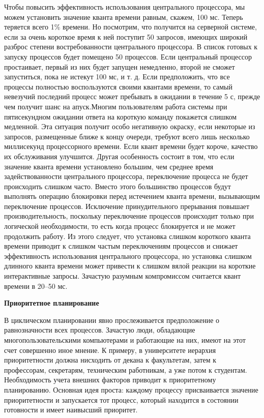 Чтобы повысить эффективность использования центрального процессора, мы можем установить значение кванта времени равным, скажем, 100 мс. Теперь теряется всего 1\% времени. Но посмотрим, что получится на серверной системе, если за очень короткое время к ней поступит 50 запросов, имеющих широкий разброс степени востребованности центрального процессора. В список готовых к запуску процессов будет помещено 50 процессов. Если центральный процессор простаивает, первый из них будет запущен немедленно, второй не сможет запуститься, пока не истекут 100 мс, и т. д. Если предположить, что все процессы полностью воспользуются своими квантами времени, то самый невезучий последний процесс может пребывать в ожидании в течение 5 с, прежде чем получит шанс на апуск.Многим пользователям работа системы при пятисекундном ожидании ответа на короткую команду покажется слишком медленной. Эта ситуация получит особо негативную окраску, если некоторые из запросов, размещенные ближе к концу очереди, требуют всего лишь несколько миллисекунд процессорного времени. Если квант времени будет короче, качество их обслуживания улучшится. Другая особенность состоит в том, что если значение кванта времени установлено большим, чем среднее время задействованности центрального процессора, переключение процесса не будет происходить слишком часто. Вместо этого большинство процессов будут выполнять операцию блокировки перед истечением кванта времени, вызывающим переключение процессов. Исключение принудительного прерывания повышает производительность, поскольку переключение процессов происходит только при логической необходимости, то есть когда процесс блокируется и не может продолжить работу. Из этого следует, что установка слишком короткого кванта времени приводит к слишком частым переключениям процессов и снижает эффективность использования центрального процессора, но установка слишком длинного кванта времени может привести к слишком вялой реакции на короткие интерактивные запросы. Зачастую разумным компромиссом считается квант времени в 20–50 мс.

\textbf{Приоритетное планирование}

В циклическом планировании явно прослеживается предположение о равнозначности всех процессов. Зачастую люди, обладающие многопользовательскими компьютерами и работающие на них, имеют на этот счет совершенно иное мнение. К примеру, в университете иерархия приоритетности должна нисходить от декана к факультетам, затем к профессорам, секретарям, техническим работникам, а уже потом к студентам. Необходимость учета внешних факторов приводит к приоритетному планированию. Основная идея проста: каждому процессу присваивается значение приоритетности и запускается тот процесс, который находится в состоянии готовности и имеет наивысший приоритет.


